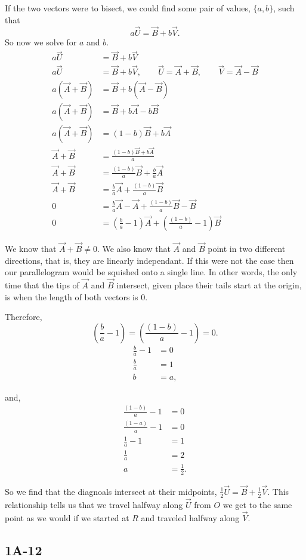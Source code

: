 If the two vectors were to bisect, we could find some pair of values, 
$\{a,b\}$, such that \[ a\vec{U} = \vec{B} + b\vec{V}. \]
So now we solve for $a$ and $b$.
\begin{align*}
a\vec{U} &= \vec{B} + b\vec{V}\\
a\vec{U} &=  \vec{B} + b\vec{V}, 
\hspace{2em}\vec{U} = \vec{A}+\vec{B},
\hspace{2em}\vec{V} = \vec{A}-\vec{B}\\
a(\vec{A} + \vec{B}) &= \vec{B} + b(\vec{A}-\vec{B})\\
a(\vec{A} + \vec{B}) &= \vec{B} + b\vec{A}-b\vec{B}\\
a(\vec{A} + \vec{B}) &= (1-b)\vec{B} + b\vec{A}\\
\vec{A} + \vec{B} &= \frac{(1-b)\vec{B} + b\vec{A}}{a}\\
\vec{A} + \vec{B} &= \frac{(1-b)}{a}\vec{B} + \frac{b}{a}\vec{A}\\
\vec{A} + \vec{B} &= \frac{b}{a}\vec{A} + \frac{(1-b)}{a}\vec{B} \\
0 &= \frac{b}{a}\vec{A} -\vec{A} + \frac{(1-b)}{a}\vec{B}  -\vec{B}\\
0 &= (\frac{b}{a} - 1)\vec{A} + (\frac{(1-b)}{a} - 1)\vec{B}
\end{align*}

We know that $\vec{A} + \vec{B} \neq 0$. We also know that $\vec{A}$ and $\vec{B}$
point in two different directions, that is, they are linearly independant. If this
were not the case then our parallelogram would be squished onto a single line.
In other words, the only time that the tips of $\vec{A}$ and $\vec{B}$ intersect, 
given place their tails start at the origin, is when the length of both vectors is $0$.

Therefore,
\[(\frac{b}{a} - 1) = (\frac{(1-b)}{a} - 1) = 0.\]
\begin{align*}
\frac{b}{a} - 1 &= 0\\
\frac{b}{a} &= 1\\
b &= a,
\end{align*}

and,
\begin{align*}
\frac{(1-b)}{a} - 1 &= 0\\
\frac{(1-a)}{a} - 1 &= 0\\
\frac{1}{a} - 1 &= 1\\
\frac{1}{a} &= 2\\
a &= \frac{1}{2}.
\end{align*}

So we find that the diagnoals intersect at their midpoints, 
$\frac{1}{2}\vec{U} = \vec{B} + \frac{1}{2}\vec{V}$. This relationship
tells us that we travel halfway along $\vec{U}$ from $O$ we get to the same point
as we would if we started at $R$ and traveled halfway along $\vec{V}$.

\subsection*{1A-12\*}









